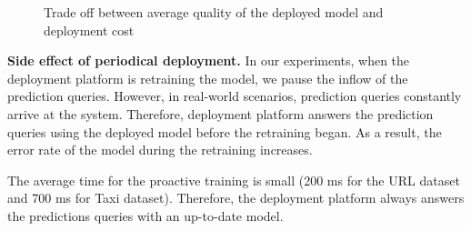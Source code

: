\begin{figure}[!h]
\centering
\resizebox{\columnwidth}{!}{}
\caption{Trade off between average quality of the deployed model and deployment cost}
\label{trade-off-figure}
\end{figure}

\textbf{Side effect of periodical deployment.}
In our experiments, when the deployment platform is retraining the model, we pause the inflow of the prediction queries. 
However, in real-world scenarios, prediction queries constantly arrive at the system.
Therefore, deployment platform answers the prediction queries using the deployed model before the retraining began.
As a result, the error rate of the model during the retraining increases.

The average time for the proactive training is small (200 ms for the URL dataset and 700 ms for Taxi dataset).
Therefore, the deployment platform always answers the predictions queries with an up-to-date model.


